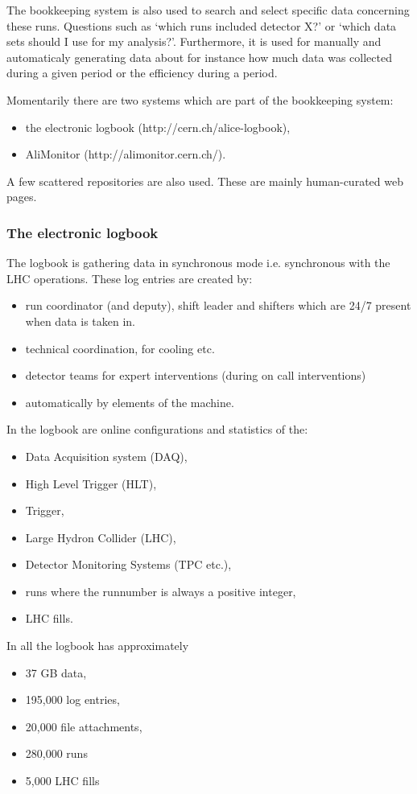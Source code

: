 The bookkeeping system is also used to search and select specific data concerning these runs. Questions such as `which runs included detector X?' or `which data sets should I use for my analysis?'. Furthermore, it is used for manually and automaticaly generating data about for instance how much data was collected during a given period or the efficiency during a period.

Momentarily there are two systems which are part of the bookkeeping system:
\begin{itemize}
  \item the electronic logbook (http://cern.ch/alice-logbook),
  \item AliMonitor (http://alimonitor.cern.ch/).
\end{itemize}
A few scattered repositories are also used. These are mainly human-curated web pages.


\subsubsection{The electronic logbook}
The logbook is gathering data in synchronous mode i.e. synchronous with the LHC operations. These log entries are created by:
\begin{itemize}
  \item run coordinator (and deputy), shift leader and shifters which are 24/7 present when data is taken in.
  \item technical coordination, for cooling etc.
  \item detector teams for expert interventions (during on call interventions)
  \item automatically by elements of the machine.
\end{itemize}

In the logbook are online configurations and statistics of the:
\begin{itemize}
  \item Data Acquisition system (DAQ),
  \item High Level Trigger (HLT),
  \item Trigger,
  \item Large Hydron Collider (LHC),
  \item Detector Monitoring Systems (TPC etc.),
  \item runs where the runnumber is always a positive integer,
  \item LHC fills.
\end{itemize}

In all the logbook has approximately
\begin{itemize}
  \item 37 GB data,
  \item 195,000 log entries,
  \item 20,000 file attachments,
  \item 280,000 runs
  \item 5,000 LHC fills
\end{itemize}

